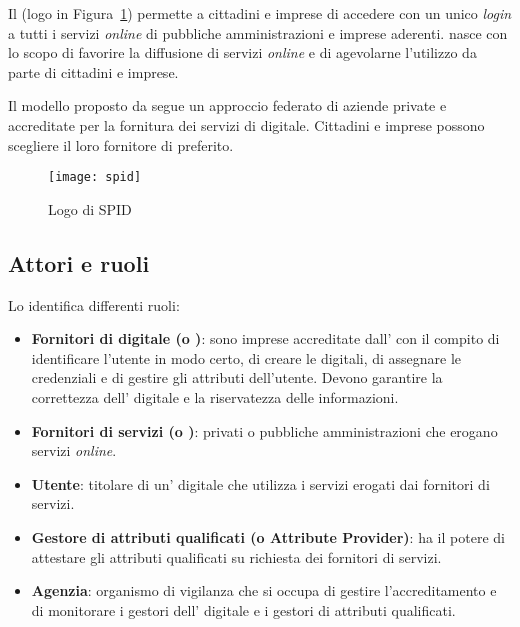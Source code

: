 Il  (logo in Figura~\ref{fig:spid}) permette a cittadini e imprese di accedere con un unico \textit{login} a tutti i servizi \textit{online} di pubbliche amministrazioni e imprese aderenti.  nasce con lo scopo di favorire la diffusione di servizi \textit{online} e di agevolarne l'utilizzo da parte di cittadini e imprese. 

Il modello proposto da  segue un approccio federato di aziende private e accreditate per la fornitura dei servizi di  digitale. Cittadini e imprese possono scegliere il loro fornitore di  preferito.


\begin{figure}[h]
\begin{center}
\texttt{[image: spid]}
\caption[Logo di SPID]{Logo di SPID\protect\footnotemark}
\label{fig:spid}
\end{center}
\end{figure}

\subsection{Attori e ruoli}
Lo  identifica differenti ruoli:
\begin{itemize}
\item \textbf{Fornitori di  digitale (o )}: sono imprese accreditate dall' con il compito di identificare l'utente in modo certo, di creare le  digitali, di assegnare le credenziali e di gestire gli attributi dell'utente. Devono garantire la correttezza dell' digitale e la riservatezza delle informazioni.
\item \textbf{Fornitori di servizi (o )}: privati o pubbliche amministrazioni che erogano servizi \textit{online}.
\item \textbf{Utente}: titolare di un' digitale  che utilizza i servizi erogati dai fornitori di servizi.
\item \textbf{Gestore di attributi qualificati (o Attribute Provider)}: ha il potere di attestare gli attributi qualificati su richiesta dei fornitori di servizi.
\item \textbf{Agenzia}: organismo di vigilanza che si occupa di gestire l'accreditamento e di monitorare i gestori dell' digitale e i gestori di attributi qualificati.
\end{itemize}

